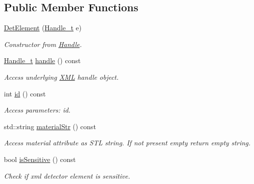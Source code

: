 \subsection*{Public Member Functions}
\begin{DoxyCompactItemize}
\item 
\hyperlink{struct_d_d4hep_1_1_x_m_l_1_1_det_element_af9a3855887f30e3cb111f8c19956c7c6}{DetElement} (\hyperlink{class_d_d4hep_1_1_x_m_l_1_1_handle__t}{Handle\_\-t} e)
\begin{DoxyCompactList}\small\item\em Constructor from \hyperlink{class_d_d4hep_1_1_handle}{Handle}. \item\end{DoxyCompactList}\item 
\hyperlink{class_d_d4hep_1_1_x_m_l_1_1_handle__t}{Handle\_\-t} \hyperlink{struct_d_d4hep_1_1_x_m_l_1_1_det_element_a0ff536f81c598c734503c109bdbf6d6a}{handle} () const 
\begin{DoxyCompactList}\small\item\em Access underlying \hyperlink{namespace_d_d4hep_1_1_x_m_l}{XML} handle object. \item\end{DoxyCompactList}\item 
int \hyperlink{struct_d_d4hep_1_1_x_m_l_1_1_det_element_ab792b1e02d95042fd94897283df9f8fa}{id} () const 
\begin{DoxyCompactList}\small\item\em Access parameters: id. \item\end{DoxyCompactList}\item 
std::string \hyperlink{struct_d_d4hep_1_1_x_m_l_1_1_det_element_a4e26d21d5a57f5c02d69dc36cc9d6492}{materialStr} () const 
\begin{DoxyCompactList}\small\item\em Access material attribute as STL string. If not present empty return empty string. \item\end{DoxyCompactList}\item 
bool \hyperlink{struct_d_d4hep_1_1_x_m_l_1_1_det_element_a5951ac81186673b5ecd480884cf52c96}{isSensitive} () const 
\begin{DoxyCompactList}\small\item\em Check if xml detector element is sensitive. \item\end{DoxyCompactList}\item 

\end{DoxyCompactItemize}
